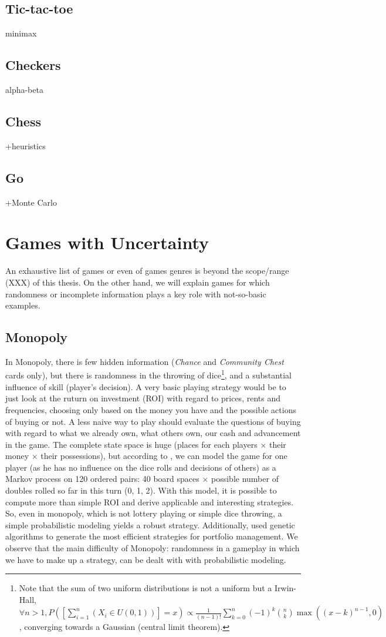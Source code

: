 \subsection{Tic-tac-toe}
minimax
\subsection{Checkers}
alpha-beta
\subsection{Chess}
+heuristics
\subsection{Go}
+Monte Carlo

\section{Games with Uncertainty}
An exhaustive list of games or even of games genres is beyond the scope/range (XXX) of this thesis. On the other hand, we will explain games for which randomness or incomplete information plays a key role with not-so-basic examples.

\subsection{Monopoly}
In Monopoly, there is few hidden information (\textit{Chance} and \textit{Community Chest} cards only), but there is randomness in the throwing of dice\footnote{Note that the sum of two uniform distributions is not a uniform but a Irwin-Hall, $\forall n>1, P([\sum_{i=1}^n{(X_i\in U(0,1))}]=x) \propto \frac{1}{(n-1)!}\sum_{k=0}^n(-1)^k{n\choose k}\max{((x-k)^{n-1},0)}$, converging towards a Gaussian (central limit theorem).}, and a substantial influence of skill (player's decision). A very basic playing strategy would be to just look at the ruturn on investment (ROI) with regard to prices, rents and frequencies, choosing only based on the money you have and the possible actions of buying or not. A less naive way to play should evaluate the questions of buying with regard to what we already own, what others own, our cash and advancement in the game. The complete state space is huge (places for each players $\times$ their money $\times$ their possessions), but according to \cite{MonopolyMarkov}, we can model the game for one player (as he has no influence on the dice rolls and decisions of others) as a Markov process on 120 ordered pairs: 40 board spaces $\times$ possible number of doubles rolled so far in this turn (0, 1, 2). With this model, it is possible to compute more than simple ROI and derive applicable and interesting strategies. So, even in monopoly, which is not lottery playing or simple dice throwing, a simple probabilistic modeling yields a robust strategy. Additionally, \cite{MonopolyFrayn05} used genetic algorithms to generate the most efficient strategies for portfolio management. We observe that the main difficulty of Monopoly: randomness in a gameplay in which we have to make up a strategy, can be dealt with with probabilistic modeling.

